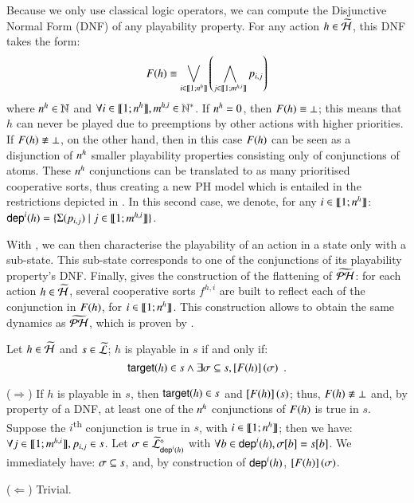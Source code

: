 Because we only use classical logic operators, we can compute the Disjunctive Normal Form (DNF) of any playability property.
For any action $h \in \widetilde{\mathcal{H}}$, this DNF takes the form:
\[F(h) \equiv \bigvee_{i \in \llbracket 1; n^{h} \rrbracket} \left( \bigwedge_{j \in \llbracket 1; m^{h,i} \rrbracket} p_{i,j} \right)\]
where $n^{h} \in \mathbb{N}$ and $\forall i \in \llbracket 1; n^{h} \rrbracket, m^{h,i} \in \mathbb{N}^*$.
If $n^{h} = 0$, then $F(h) \equiv \bot$; this means that $h$ can never be played
due to preemptions by other actions with higher priorities.
If $F(h) \not\equiv \bot$, on the other hand, then in this case $F(h)$
can be seen as a disjunction of $n^{h}$ smaller playability properties consisting only of conjunctions of atoms.
These $n^{h}$ conjunctions can be translated to as many prioritised cooperative sorts,
thus creating a new PH model which is entailed in the restrictions depicted in .
In this second case, we denote, for any $i \in \llbracket 1; n^{h} \rrbracket$:
$\mathsf{dep}^{i}(h) = \{ \Sigma(p_{i,j}) \mid j \in \llbracket 1; m^{h,i} \rrbracket \}$.

With , we can then characterise the playability of an action in a state only with a sub-state.
This sub-state corresponds to one of the conjunctions of its playability property's DNF.
Finally,  gives the construction of the flattening of $\widetilde{\mathcal{PH}}$:
for each action $h \in \widetilde{\mathcal{H}}$, several cooperative sorts $f^{h,i}$ are built to reflect each of the conjunction in $F(h)$,
\ie for $i \in \llbracket 1; n^{h} \rrbracket$.
This construction allows to obtain the same dynamics as $\widetilde{\mathcal{PH}}$, which is proven by .
%
\begin{theorem}
\label{th:ppplaysubset}
  Let $h \in \widetilde{\mathcal{H}}$ and $s \in \widetilde{\mathcal{L}}$;
  $h$ is playable in $s$ if and only if:
  \[\mathsf{target}(h) \in s \wedge \exists \sigma \subseteq s, \left[F(h)\right](\sigma) \enspace.\]
\end{theorem}
%
\begin{proofppplaysubset}
  ($\Rightarrow$)
    If $h$ is playable in $s$, then $\mathsf{target}(h) \in s$ and $\left[F(h)\right](s)$;
    thus, $F(h) \not\equiv \bot$ and, by property of a DNF,
    at least one of the $n^{h}$ conjunctions of $F(h)$ is true in $s$.
    Suppose the $i$\textsuperscript{th} conjunction is true in $s$, with $i \in \llbracket 1; n^{h} \rrbracket$;
    then we have: $\forall j \in \llbracket 1; m^{h,i} \rrbracket, p_{i,j} \in s$.
    Let $\sigma \in \widetilde{\mathcal{L}}^\diamond_{\mathsf{dep}^{i}(h)}$
    with $\forall b \in \mathsf{dep}^{i}(h), {\sigma[b]} = {s[b]}$.
    We immediately have: $\sigma \subseteq s$,
    and, by construction of $\mathsf{dep}^{i}(h)$, $\left[F(h)\right](\sigma)$.
  
  ($\Leftarrow$)
    Trivial.
\end{proofppplaysubset}


